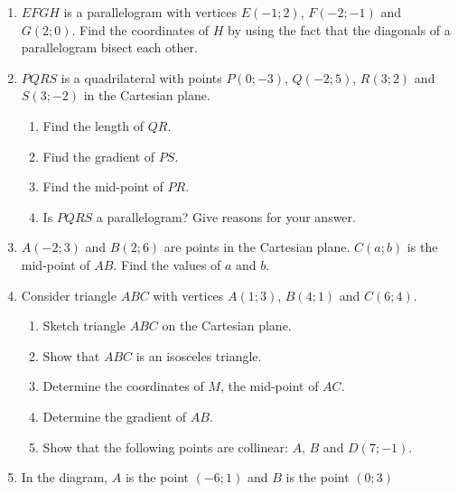\begin{exercises}{}
{\begin{enumerate}[itemsep=5pt, label=\textbf{\arabic*}. ]
\begin{eocexercises}{}
\begin{enumerate}[noitemsep, label=\textbf{\arabic*}. ]
\begin{enumerate}[noitemsep, label=\textbf{(\alph*)} ]
      \begin{enumerate}[noitemsep, label=\textbf{\roman*}. ] 
      \item $PS$
      \item $QR$
      \end{enumerate}
    \item What kind of quadrilateral is $PQRS$? Give reasons for your answer.
    \end{enumerate}
  \item $EFGH$ is a parallelogram with vertices $E(-1;2)$, $F(-2;-1)$ and $G(2;0)$. Find the coordinates of $H$ by using the fact that the diagonals of a parallelogram bisect each other.
  \item  $PQRS$ is a quadrilateral with points $P(0;-3)$, $Q(-2;5)$, $R(3;2)$ and $S(3;-2)$  in the Cartesian plane.
    \begin{enumerate}[noitemsep, label=\textbf{(\alph*)} ]
    \item Find the length of $QR$.
    \item Find the gradient of $PS$.
    \item Find the mid-point of $PR$.
    \item Is $PQRS$ a parallelogram?  Give reasons for your answer.
    \end{enumerate}
  \item $A(-2;3)$ and $B(2;6)$ are points in the Cartesian plane. $C(a;b)$ is the mid-point of $AB$. Find the values of $a$ and $b$.
  \item Consider triangle $ABC$ with vertices $A(1; 3)$, $B(4;1)$ and $C(6; 4)$.
    \begin{enumerate}[noitemsep, label=\textbf{(\alph*)} ]
    \item Sketch triangle $ABC$ on the Cartesian plane. 
    \item Show that $ABC$ is an isosceles triangle.
    \item Determine the coordinates of $M$, the mid-point of $AC$.
    \item Determine the gradient of $AB$.
    \item Show that the following points are collinear: $A$, $B$ and $D(7;-1)$.
    \end{enumerate}
  \item In the diagram, $A$ is the point $(-6;1)$ and $B$ is the point $(0;3)$
    \setcounter{subfigure}{0}
    \begin{figure}[H] %
      \begin{center}
        \scalebox{.8}{
}
\end{center}
\end{figure}
\end{enumerate}
\end{eocexercises}
\end{enumerate}}
\end{exercises}
